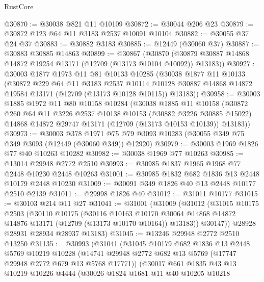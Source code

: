 \begin{lexlean}{RustCore}
\begin{coremodule}
@30870 := @30038 @821 @11 @10109
@30872 := @30044 @206 @23
@30879 := @30872 @123 @64 @11 @3183 @2537 @10091 @10104
@30882 := @30055 @37 @24 @37
@30883 := @30882 @3183
@30885 := @12449 (@30060 @37)
@30887 := @30883 @30885 @14863
@30899 := @30867
    (@30870 (@30879 @30887 @14868 @14872 @19254 @13171 (@12709 (@13173 @10104 @10092)) @13183))
@30927 := @30003
    @1877
    @1973
    @11
    @81
    @10133
    @10285
    (@30038
      @1877
      @11
      @10133
      (@30872
        @229
        @64
        @11
        @3183
        @2537
        @10114
        @10128
        @30887
        @14868
        @14872
        @19584
        @13171
        (@12709 (@13173 @10128 @10115))
        @13183))
@30958 := @30003
    @1885
    @1972
    @11
    @80
    @10158
    @10284
    (@30038
      @1885
      @11
      @10158
      (@30872
        @260
        @64
        @11
        @3226
        @2537
        @10138
        @10153
        (@30882 @3226 @30885 @15022)
        @14868
        @14872
        @29747
        @13171
        (@12709 (@13173 @10153 @10139))
        @13183))
@30973 := @30003
    @378
    @1971
    @75
    @79
    @3093
    @10283
    (@30055 @349 @75 @349 @3093 (@12449 (@30060 @349)) @12920)
@30979 := @30003 @1969 @1826 @77 @40 @10263 @10282
@30982 := @30038 @1969 @77 @10263
@30985 := @13014 @29948 @2772 @2510
@30993 := @30985 @1837 @1965 @1968 @77 @2448 @10230 @2448 @10263
@31001 := @30985 @1832 @682 @1836 @13 @2448 @10179 @2448 @10230
@31009 := @30091 @349 @1826 @40 @13 @2448 @10177 @2510 @2139
@31011 := @29998 @1826 @40
@31012 := @31011 @10177
@31015 := @30103 @214 @11 @27
@31041 := @31001
    (@31009
      (@31012
        (@31015
          @10175
          @2503
          (@30110
            @10175
            (@30116
              @10163
              @10170
              @30064
              @14868
              @14872
              @14876
              @13171
              (@12709 (@13173 @10170 @10164))
              @13183))
          @30147))
      @28928
      @28931
      @28934
      @28937
      @13183)
@31045 := @13246 @29948 @2772 @2510 @13250
@31135 := @30993
    (@31041
      (@31045
        @10179
        @682
        @1836
        @13
        @2448
        @5769
        @10219
        @10228
        (@14741 @29948 @2772 @682 @13 @5769 (@17747 @29948 @2772 @679 @13 @5768 @17771))
        (@30017
          @661
          @1835
          @43
          @13
          @10219
          @10226
          @4444
          (@30026
            @1824
            @1681
            @11
            @40
            @10205
            @10218

\end{coremodule}
\end{lexlean}
